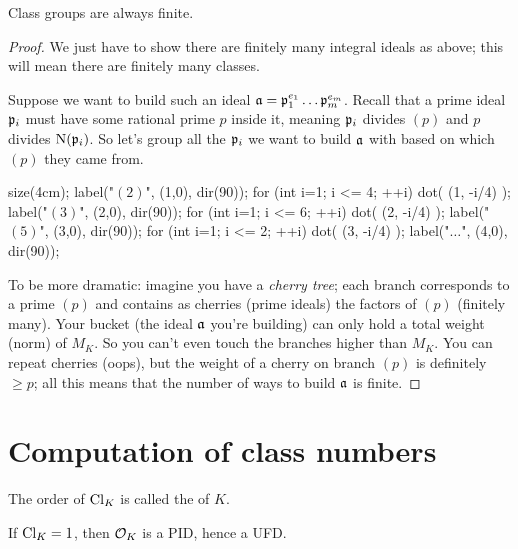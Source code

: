 \begin{corollary}
	Class groups are always finite.
\end{corollary}
\begin{proof}
	We just have to show there are finitely many integral ideals as above;
	this will mean there are finitely many classes.

	Suppose we want to build such an ideal $\mathfrak a = \mathfrak p_1^{e_1} \dots \mathfrak p_m^{e_m}$.
	Recall that a prime ideal $\mathfrak p_i$ must have some rational prime $p$ inside it,
	meaning $\mathfrak p_i$ divides $(p)$ and $p$ divides $\operatorname{N}(\mathfrak p_i)$.
	So let's group all the $\mathfrak p_i$ we want to build $\mathfrak a$ with based on which $(p)$ they came from.
	\begin{center}
		\begin{asy}
			size(4cm);
			label("$(2)$", (1,0), dir(90));
			for (int i=1; i <= 4; ++i) dot( (1, -i/4) );
			label("$(3)$", (2,0), dir(90));
			for (int i=1; i <= 6; ++i) dot( (2, -i/4) );
			label("$(5)$", (3,0), dir(90));
			for (int i=1; i <= 2; ++i) dot( (3, -i/4) );
			label("$\dots$", (4,0), dir(90));
		\end{asy}
	\end{center}
	To be more dramatic: imagine you have a \emph{cherry tree};
	each branch corresponds to a prime $(p)$
	and contains as cherries (prime ideals) the factors of $(p)$ (finitely many).
	Your bucket (the ideal $\mathfrak a$ you're building) can only hold a total weight
	(norm) of $M_K$.  So you can't even touch the branches higher than $M_K$.
	You can repeat cherries (oops),
	but the weight of a cherry on branch $(p)$ is definitely $\ge p$;
	all this means that the number of ways to build $\mathfrak a$ is finite.
\end{proof}

\section{Computation of class numbers}
\begin{definition}
The order of $\mathrm{Cl}_K$ is called the  of $K$.
\end{definition}
\begin{remark}
	If $\mathrm{Cl}_K = 1$, then $\mathcal O_K$ is a PID, hence a UFD.
\end{remark}


